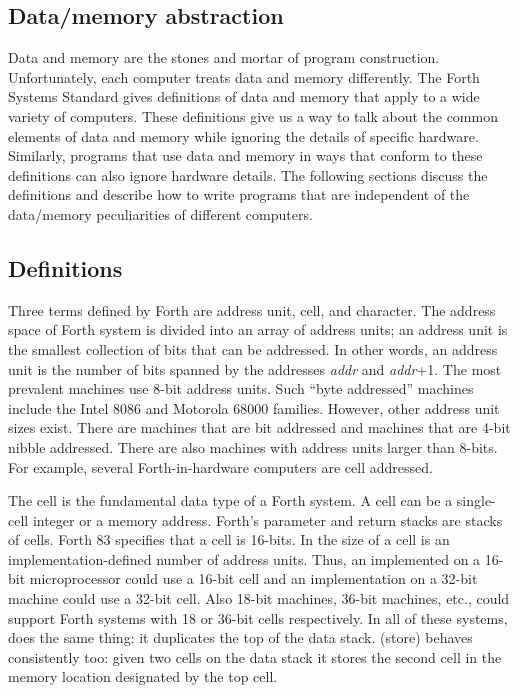 \subsection{Data/memory abstraction} %

Data and memory are the stones and mortar of program construction.
Unfortunately, each computer treats data and memory differently. The
 Forth Systems Standard gives definitions of data and memory that
apply to a wide variety of computers. These definitions give us a way
to talk about the common elements of data and memory while ignoring
the details of specific hardware. Similarly,  programs that
use data and memory in ways that conform to these definitions can
also ignore hardware details. The following sections discuss the
definitions and describe how to write programs that are independent
of the data/memory peculiarities of different computers.

\subsection{Definitions} %

Three terms defined by  Forth are address unit, cell, and character.
The address space of  Forth system is divided into an array of
address units; an address unit is the smallest collection of bits that
can be addressed. In other words, an address unit is the number of
bits spanned by the addresses \emph{addr} and \emph{addr}+1. The most
prevalent machines use 8-bit address units. Such ``byte addressed''
machines include the Intel 8086 and Motorola 68000 families. However,
other address unit sizes exist. There are machines that are bit
addressed and machines that are 4-bit nibble addressed. There are
also machines with address units larger than 8-bits. For example,
several Forth-in-hardware computers are cell addressed.

The cell is the fundamental data type of a Forth system. A cell can
be a single-cell integer or a memory address. Forth's parameter and
return stacks are stacks of cells. Forth 83 specifies that a cell is
16-bits. In  the size of a cell is an implementation-defined
number of address units. Thus, an  implemented on a 16-bit
microprocessor could use a 16-bit cell and an implementation on a
32-bit machine could use a 32-bit cell. Also 18-bit machines, 36-bit
machines, etc., could support  Forth systems with 18 or 36-bit
cells respectively. In all of these systems,  does the same
thing: it duplicates the top of the data stack. \word{!} (store)
behaves consistently too: given two cells on the data stack it
stores the second cell in the memory location designated by the
top cell.


